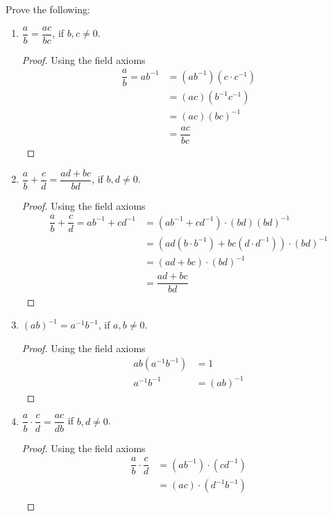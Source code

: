 \begin{exercise}[\textbf{3}] Prove the following:
     \begin{enumerate}
         \item $\dfrac{a}{b} = \dfrac{ac}{bc}$, if $b,c \neq 0$.
         \begin{proof} Using the field axioms
              \begin{align*}
                  \dfrac{a}{b} = ab^{-1} &= (ab^{-1})(c\cdot c^{-1}) \\
                  &= (ac)(b^{-1}c^{-1}) \\
                  &= (ac)(bc)^{-1} \\
                  &= \dfrac{ac}{bc}
              \end{align*}
         \end{proof}
         \item $\dfrac{a}{b}+\dfrac{c}{d} = \dfrac{ad+bc}{bd}$, if $b,d \neq 0$.
         \begin{proof} Using the field axioms   
              \begin{align*}
                  \dfrac{a}{b}+\dfrac{c}{d} = ab^{-1}+cd^{-1} &= (ab^{-1}+cd^{-1})\cdot (bd)(bd)^{-1} \\
                  &= (ad(b\cdot b^{-1})+bc(d\cdot d^{-1}))\cdot (bd)^{-1} \\
                  &= (ad+bc)\cdot (bd)^{-1} \\
                  &= \dfrac{ad+bc}{bd}
              \end{align*}
         \end{proof}
         \pagebreak
         \item $(ab)^{-1} = a^{-1}b^{-1}$, if $a,b\neq 0$. 
         \begin{proof} Using the field axioms
              \begin{align*}
                  ab(a^{-1}b^{-1}) &=  1 \\
                  a^{-1}b^{-1} &= (ab)^{-1}
              \end{align*}
         \end{proof}
         \item $\dfrac{a}{b}\cdot \dfrac{c}{d} = \dfrac{ac}{db}$ if $b,d\neq 0$.
         \begin{proof} Using the field axioms
              \begin{align*}
                  \dfrac{a}{b}\cdot \dfrac{c}{d} &= (ab^{-1})\cdot (cd^{-1}) \\
                  &= (ac)\cdot(d^{-1}b^{-1}) \\

\end{align*}
\end{proof}
\end{enumerate}
\end{exercise}
